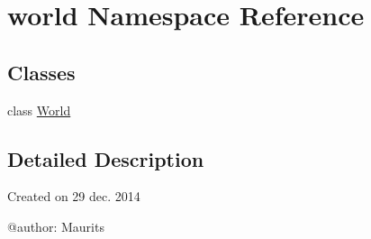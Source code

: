 \hypertarget{namespaceworld}{}\section{world Namespace Reference}
\label{namespaceworld}
\subsection*{Classes}
\begin{DoxyCompactItemize}
\item 
class \hyperlink{classworld_1_1_world}{World}
\end{DoxyCompactItemize}


\subsection{Detailed Description}
\begin{DoxyVerb}Created on 29 dec. 2014

@author: Maurits
\end{DoxyVerb}
 